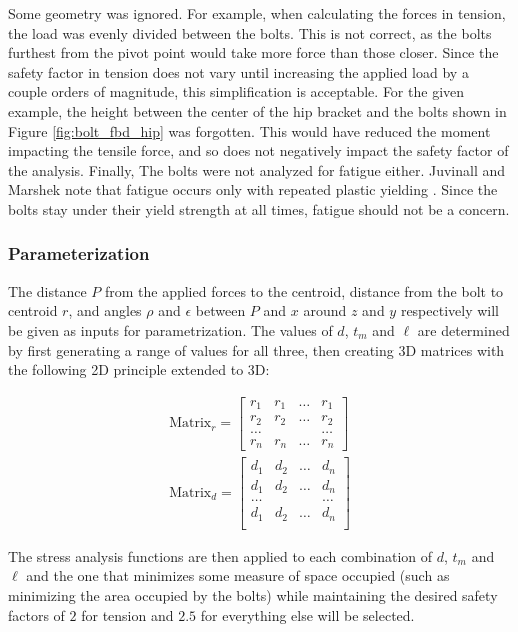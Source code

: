 Some geometry was ignored.
For example, when calculating the forces in tension, the load was evenly divided between the bolts. This is not correct, as the bolts furthest from the pivot point would take more force than those closer.
Since the safety factor in tension does not vary until increasing the applied load by a couple orders of magnitude, this simplification is acceptable.
For the given example, the height between the center of the hip bracket and the bolts shown in Figure \ref{fig:bolt_fbd_hip} was forgotten.
This would have reduced the moment impacting the tensile force, and so does not negatively impact the safety factor of the analysis.
Finally, The bolts were not analyzed for fatigue either.
Juvinall and Marshek note that fatigue occurs only with repeated plastic yielding \cite{juvinall_fundamentals_2012}.
Since the bolts stay under their yield strength at all times, fatigue should not be a concern.


\subsubsection{Parameterization}

The distance $P$ from the applied forces to the centroid, distance from the bolt to centroid $r$, and angles $\rho$ and $\epsilon$ between $P$ and $x$ around $z$ and $y$ respectively will be given as inputs for parametrization.
The values of $d$, $t_m$ and $\ell$ are determined by first generating a range of values for all three, then creating 3D matrices with the following 2D principle extended to 3D:

\begin{gather}
    \text{Matrix}_r = 
    \begin{bmatrix}{}
        r_1 & r_1 & \dots & r_1 \\
        r_2 & r_2 & \dots & r_2 \\
        \dots  &  &       & \dots \\
        r_n & r_n & \dots & r_n
    \end{bmatrix}
    \\
    \text{Matrix}_d = 
    \begin{bmatrix}{}
        d_1 & d_2 & \dots & d_n \\
        d_1 & d_2 & \dots & d_n \\
        \dots & & & \dots \\
        d_1 & d_2 & \dots & d_n \\
    \end{bmatrix}
\end{gather}{}

The stress analysis functions are then applied to each combination of $d$, $t_m$ and $\ell$ and the one that minimizes some measure of space occupied (such as minimizing the area occupied by the bolts) while maintaining the desired safety factors of $2$ for tension and $2.5$ for everything else will be selected.